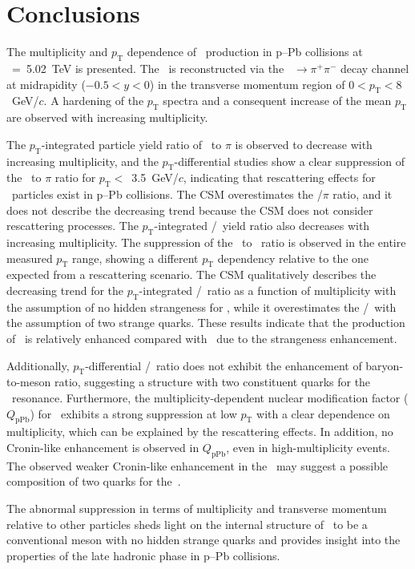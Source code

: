 
\section{Conclusions}
\label{sec:summary}

The multiplicity and $p_{\mathrm{T}}$ dependence of \fzero~production in p--Pb collisions at \snn~=~5.02~TeV is presented. The \fzero~is reconstructed via the \fzero~$\rightarrow\pi^{+}\pi^{-}$ decay channel at midrapidity ($-0.5<y<0$) in the transverse momentum region of $0<p_{\mathrm{T}}<8$~GeV/$c$. A hardening of the $p_{\mathrm{T}}$ spectra and a consequent increase of the mean $p_{\mathrm{T}}$ are observed with increasing multiplicity. 

The $p_{\mathrm{T}}$-integrated particle yield ratio of \fzero~to $\pi$ is observed to decrease with increasing multiplicity, and the $p_{\mathrm{T}}$-differential studies show a clear suppression of the \fzero~to $\pi$ ratio for $p_{\mathrm{T}}<$~3.5~GeV/$c$, indicating that rescattering effects for \fzero~particles exist in p--Pb collisions. The CSM overestimates the \fzero/$\pi$ ratio, and it does not describe the decreasing trend because the CSM does not consider rescattering processes. The $p_{\mathrm{T}}$-integrated \fzero/\kstar~yield ratio also decreases with increasing multiplicity. The suppression of the \fzero~to \kstar~ratio is observed in the entire measured $p_{\mathrm{T}}$ range, showing a different $p_{\mathrm{T}}$ dependency relative to the one expected from a rescattering scenario. The CSM qualitatively describes the decreasing trend for the $p_{\mathrm{T}}$-integrated \fzero/\kstar~ratio as a function of multiplicity with the assumption of no hidden strangeness for \fzero, while it overestimates the \fzero/\kstar~with the assumption of two strange quarks. These results indicate that the production of \kstar~is relatively enhanced compared with \fzero~due to the strangeness enhancement. 

Additionally, $p_{\mathrm{T}}$-differential \fzero/\kstar~ratio does not exhibit the enhancement of baryon-to-meson ratio, suggesting a structure with two constituent quarks for the \fzero~resonance. Furthermore, the multiplicity-dependent nuclear modification factor ($Q_{\mbox{pPb}}$) for \fzero~exhibits a strong suppression at low $p_{\mathrm{T}}$ with a clear dependence on multiplicity, which can be explained by the rescattering effects. In addition, no Cronin-like enhancement is observed in $Q_{\mbox{pPb}}$, even in high-multiplicity events. The observed weaker Cronin-like enhancement in the \fzero~may suggest a possible composition of two quarks for the~\fzero. 

The abnormal suppression in terms of multiplicity and transverse momentum relative to other particles sheds light on the internal structure of \fzero~to be a conventional meson with no hidden strange quarks and provides insight into the properties of the late hadronic phase in p--Pb collisions.
